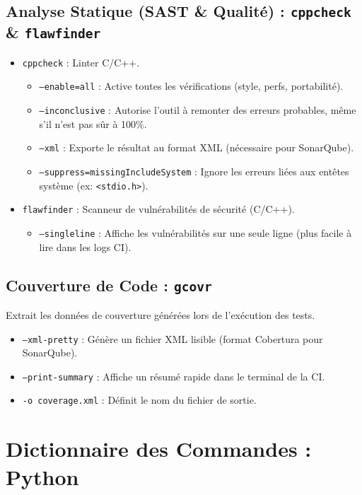 \documentclass[11pt, a4paper]{report}
\begin{document}
\subsection{Analyse Statique (SAST \& Qualité) : \texttt{cppcheck} \& \texttt{flawfinder}}
\begin{itemize}[leftmargin=1.5cm]
    \item \texttt{cppcheck} : Linter C/C++.
    \begin{itemize}
        \item \texttt{--enable=all} : Active toutes les vérifications (style, perfs, portabilité).
        \item \texttt{--inconclusive} : Autorise l'outil à remonter des erreurs probables, même s'il n'est pas sûr à 100\%.
        \item \texttt{--xml} : Exporte le résultat au format XML (nécessaire pour SonarQube).
        \item \texttt{--suppress=missingIncludeSystem} : Ignore les erreurs liées aux entêtes système (ex: \texttt{<stdio.h>}).
    \end{itemize}
    \item \texttt{flawfinder} : Scanneur de vulnérabilités de sécurité (C/C++).
    \begin{itemize}
        \item \texttt{--singleline} : Affiche les vulnérabilités sur une seule ligne (plus facile à lire dans les logs CI).
    \end{itemize}
\end{itemize}

\subsection{Couverture de Code : \texttt{gcovr}}
Extrait les données de couverture générées lors de l'exécution des tests.
\begin{itemize}[leftmargin=1.5cm]
    \item \texttt{--xml-pretty} : Génère un fichier XML lisible (format Cobertura pour SonarQube).
    \item \texttt{--print-summary} : Affiche un résumé rapide dans le terminal de la CI.
    \item \texttt{-o coverage.xml} : Définit le nom du fichier de sortie.
\end{itemize}

\newpage

\section{Dictionnaire des Commandes : Python}
\end{document}
